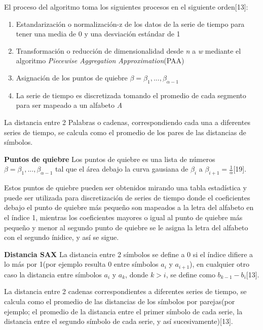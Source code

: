 	\hfill\break
	\justifying
	El proceso del algoritmo toma los siguientes procesos en el siguiente orden[13]:
	\begin{enumerate}
		\item Estandarización o normalización-z de los datos de la serie de tiempo para tener una media de 0 y una desviación estándar de 1
		\item Transformación o reducción de dimensionalidad desde \textit{n} a \textit{w} mediante el algoritmo \textit{Piecewise Aggregation Approximation}(PAA)
		\item Asignación de los puntos de quiebre $\beta = \beta_1,...,\beta_{\alpha-1}$
		\item La serie de tiempo es discretizada tomando el promedio de cada segmento para ser mapeado a un alfabeto \textit{A}
	\end{enumerate}
	
	\hfill\break
	\justifying
	La distancia entre 2 Palabras o cadenas, correspondiendo cada una a diferentes series de tiempo, se calcula como el promedio de los pares de las distancias de símbolos.
	
	\hfill \break
	\textbf{Puntos de quiebre}
	\justifying
	Los puntos de quiebre es una lista de números $\beta = \beta_1,...,\beta_{\alpha - 1}$ tal que el área debajo la curva gausiana de $\beta_i$ a $\beta_{i+1}=\frac{1}{\alpha}$[19].
	
	\hfill\break
	\justifying
	Estos puntos de quiebre pueden ser obtenidos mirando una tabla estadística y puede ser utilizada para discretización de series de tiempo donde el coeficientes debajo el punto de quiebre más pequeño son mapeados a la letra del alfabeto en el índice 1, mientras los coeficientes mayores o igual al punto de quiebre más pequeño y menor al segundo punto de quiebre se le asigna la letra del alfabeto con el segundo ínidice, y así se sigue.
	
	\hfill \break
	\textbf{Distancia SAX}
	\justifying
	La distancia entre 2 símbolos se define a 0 si el índice difiere a lo más por 1(por ejemplo resulta 0 entre símbolos $a_i$ y $a_{i+1}$), en cualquier otro caso la distancia entre símbolos $a_i$ y $a_k$, donde $k>i$, se define como $b_{k-1}-b_i$[13].
	
	\hfill\break
	\justifying
	La distancia entre 2 cadenas correspondientes a diferentes series de tiempo, se calcula como el promedio de las distancias de los símbolos por parejas(por ejemplo; el promedio de la distancia entre el primer símbolo de cada serie, la distancia entre el segundo símbolo de cada serie, y así sucesivamente)[13].

